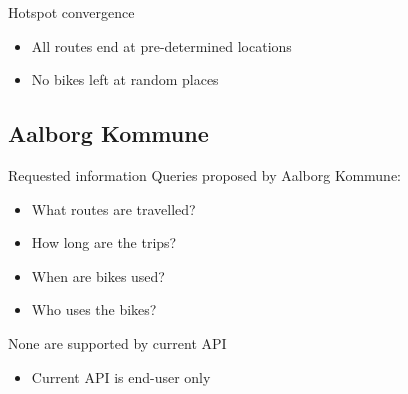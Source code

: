 \begin{frame}{Hotspot convergence}
\begin{center}
\end{center}
\begin{itemize}
\item All routes end at pre-determined locations
\item No bikes left at random places
\end{itemize}
\end{frame}

\subsection{Aalborg Kommune}
\begin{frame}{Requested information}
Queries proposed by Aalborg Kommune:
\begin{itemize}
\item What routes are travelled?
\item How long are the trips?
\item When are bikes used?
\item Who uses the bikes?
\end{itemize}\vspace{1em}
None are supported by current API
\begin{itemize}
\item Current API is end-user only
\end{itemize}
\end{frame}

